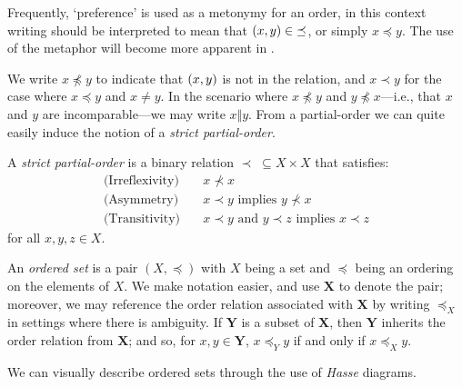 Frequently, `preference' is used as a metonymy for an order, in this context writing 
should be interpreted to mean that $(x,y)\in \; \preceq$, or simply $x \preceq y$. The use of the
metaphor will become more apparent in .

We write $x \npreceq y$ to indicate that $(x,y)$ is not in the relation, and $x \prec y$ for the case
where $x\preceq y$ and $x \not = y$. In the scenario where $x \not \preceq y$ and $y \not \preceq x$---i.e.,
that $x$ and $y$ are incomparable---we may write $x \Vert y$. From a partial-order we can quite easily
induce the notion of a \emph{strict partial-order}.

\begin{definition}
  \label{definition:strict-partial-order} A \textit{strict partial-order}
   is a binary relation $\prec \; \subseteq X \times X$
  that satisfies:
  \begin{align}
    \text{(Irreflexivity)}\quad & x \nprec x                                                \\
    \text{(Asymmetry)}\quad     & x \prec y \text{ implies }y \nprec x                      \\
    \text{(Transitivity)}\quad  & x \prec y \text{ and }y \prec z \text{ implies }x \prec z
  \end{align}
  for all $x,y,z \in X$.
\end{definition}

An \textit{ordered set} is a pair $(X, \preceq)$ with $X$ being a set and $\preceq$ being an
ordering on the elements of $X$. We make notation easier, and use $\mathbf{X}$ to denote the pair; moreover,
we may reference the order relation associated with $\mathbf{X}$ by writing $\preceq_{X}$ in
settings where there is ambiguity. If $\mathbf{Y}$ is a subset of $\mathbf{X}$, then $\mathbf{Y}$
inherits the order relation from $\mathbf{X}$; and so, for $x,y \in \mathbf{Y}$, $x \preceq_{Y}y$ if
and only if $x \preceq_{X}y$.

We can visually describe ordered sets through the use of \textit{Hasse} diagrams.

